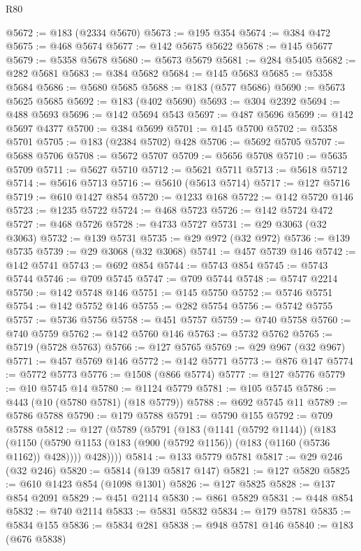 \begin{lexlean}{R80}
\begin{coremodule}
@5672 := @183 (@2334 @5670)
@5673 := @195 @354
@5674 := @384 @472
@5675 := @468 @5674
@5677 := @142 @5675 @5622
@5678 := @145 @5677
@5679 := @5358 @5678
@5680 := @5673 @5679
@5681 := @284 @5405
@5682 := @282 @5681
@5683 := @384 @5682
@5684 := @145 @5683
@5685 := @5358 @5684
@5686 := @5680 @5685
@5688 := @183 (@577 @5686)
@5690 := @5673 @5625 @5685
@5692 := @183 (@402 @5690)
@5693 := @304 @2392
@5694 := @488 @5693
@5696 := @142 @5694 @543
@5697 := @487 @5696
@5699 := @142 @5697 @4377
@5700 := @384 @5699
@5701 := @145 @5700
@5702 := @5358 @5701
@5705 := @183 (@2384 @5702) @428
@5706 := @5692 @5705
@5707 := @5688 @5706
@5708 := @5672 @5707
@5709 := @5656 @5708
@5710 := @5635 @5709
@5711 := @5627 @5710
@5712 := @5621 @5711
@5713 := @5618 @5712
@5714 := @5616 @5713
@5716 := @5610 (@5613 @5714)
@5717 := @127 @5716
@5719 := @610 @1427 @854
@5720 := @1233 @168
@5722 := @142 @5720 @146
@5723 := @1235 @5722
@5724 := @468 @5723
@5726 := @142 @5724 @472
@5727 := @468 @5726
@5728 := @4733 @5727
@5731 := @29 @3063 (@32 @3063)
@5732 := @139 @5731
@5735 := @29 @972 (@32 @972)
@5736 := @139 @5735
@5739 := @29 @3068 (@32 @3068)
@5741 := @457 @5739 @146
@5742 := @142 @5741
@5743 := @692 @854
@5744 := @5743 @854
@5745 := @5743 @5744
@5746 := @709 @5745
@5747 := @709 @5744
@5748 := @5747 @2214
@5750 := @142 @5748 @146
@5751 := @145 @5750
@5752 := @5746 @5751
@5754 := @142 @5752 @146
@5755 := @282 @5754
@5756 := @5742 @5755
@5757 := @5736 @5756
@5758 := @451 @5757
@5759 := @740 @5758
@5760 := @740 @5759
@5762 := @142 @5760 @146
@5763 := @5732 @5762
@5765 := @5719 (@5728 @5763)
@5766 := @127 @5765
@5769 := @29 @967 (@32 @967)
@5771 := @457 @5769 @146
@5772 := @142 @5771
@5773 := @876 @147
@5774 := @5772 @5773
@5776 := @1508 (@866 @5774)
@5777 := @127 @5776
@5779 := @10 @5745 @14
@5780 := @1124 @5779
@5781 := @105 @5745
@5786 := @443 (@10 (@5780 @5781) (@18 @5779))
@5788 := @692 @5745 @11
@5789 := @5786 @5788
@5790 := @179 @5788
@5791 := @5790 @155
@5792 := @709 @5788
@5812 := @127
    (@5789
      (@5791
        (@183
          (@1141 (@5792 @1144))
          (@183
            (@1150 (@5790 @1153 (@183 (@900 (@5792 @1156)) (@183 (@1160 (@5736 @1162)) @428))))
            @428))))
@5814 := @133 @5779 @5781
@5817 := @29 @246 (@32 @246)
@5820 := @5814 (@139 @5817 @147)
@5821 := @127 @5820
@5825 := @610 @1423 @854 (@1098 @1301)
@5826 := @127 @5825
@5828 := @137 @854 @2091
@5829 := @451 @2114
@5830 := @861 @5829
@5831 := @448 @854
@5832 := @740 @2114
@5833 := @5831 @5832
@5834 := @179 @5781
@5835 := @5834 @155
@5836 := @5834 @281
@5838 := @948 @5781 @146
@5840 := @183 (@676 @5838)

\end{coremodule}
\end{lexlean}
